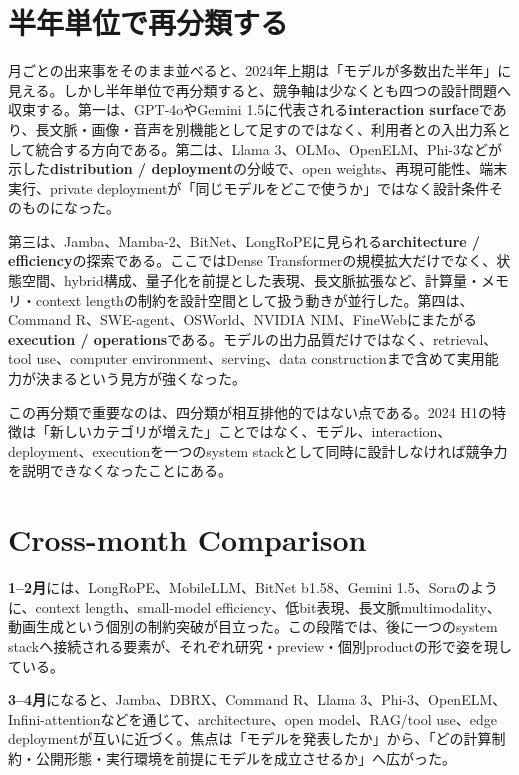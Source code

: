 \section{半年単位で再分類する}
月ごとの出来事をそのまま並べると、2024年上期は「モデルが多数出た半年」に見える。しかし半年単位で再分類すると、競争軸は少なくとも四つの設計問題へ収束する。第一は、GPT-4oやGemini 1.5に代表される\textbf{interaction surface}であり、長文脈・画像・音声を別機能として足すのではなく、利用者との入出力系として統合する方向である\autocite{src-2d3a533e91db,src-28ee6f0f00f4}。第二は、Llama 3、OLMo、OpenELM、Phi-3などが示した\textbf{distribution / deployment}の分岐で、open weights、再現可能性、端末実行、private deploymentが「同じモデルをどこで使うか」ではなく設計条件そのものになった\autocite{src-f9616f30e8f5,src-8ccec4bc715c,src-c8b746c6316b,src-e78721484043}。

第三は、Jamba、Mamba-2、BitNet、LongRoPEに見られる\textbf{architecture / efficiency}の探索である。ここではDense Transformerの規模拡大だけでなく、状態空間、hybrid構成、量子化を前提とした表現、長文脈拡張など、計算量・メモリ・context lengthの制約を設計空間として扱う動きが並行した\autocite{src-b5fbfc0d43e4,src-0cba3ed32188,src-e0e69bb00ff7}。第四は、Command R、SWE-agent、OSWorld、NVIDIA NIM、FineWebにまたがる\textbf{execution / operations}である。モデルの出力品質だけではなく、retrieval、tool use、computer environment、serving、data constructionまで含めて実用能力が決まるという見方が強くなった\autocite{src-77e35e5f22be,src-1c9f1d22c176,src-70b5d4b3bedd,src-054d1f81750b,src-51631a225b70}。

この再分類で重要なのは、四分類が相互排他的ではない点である。2024 H1の特徴は「新しいカテゴリが増えた」ことではなく、モデル、interaction、deployment、executionを一つのsystem stackとして同時に設計しなければ競争力を説明できなくなったことにある。

\section{Cross-month Comparison}
\textbf{1--2月}には、LongRoPE、MobileLLM、BitNet b1.58、Gemini 1.5、Soraのように、context length、small-model efficiency、低bit表現、長文脈multimodality、動画生成という個別の制約突破が目立った\autocite{src-e0e69bb00ff7,src-86ea660dfc62,src-28ee6f0f00f4,src-0fe343211040}。この段階では、後に一つのsystem stackへ接続される要素が、それぞれ研究・preview・個別productの形で姿を現している。

\textbf{3--4月}になると、Jamba、DBRX、Command R、Llama 3、Phi-3、OpenELM、Infini-attentionなどを通じて、architecture、open model、RAG/tool use、edge deploymentが互いに近づく\autocite{src-b5fbfc0d43e4,src-77e35e5f22be,src-f9616f30e8f5,src-e78721484043,src-c8b746c6316b,src-2eb2353f0533}。焦点は「モデルを発表したか」から、「どの計算制約・公開形態・実行環境を前提にモデルを成立させるか」へ広がった。

